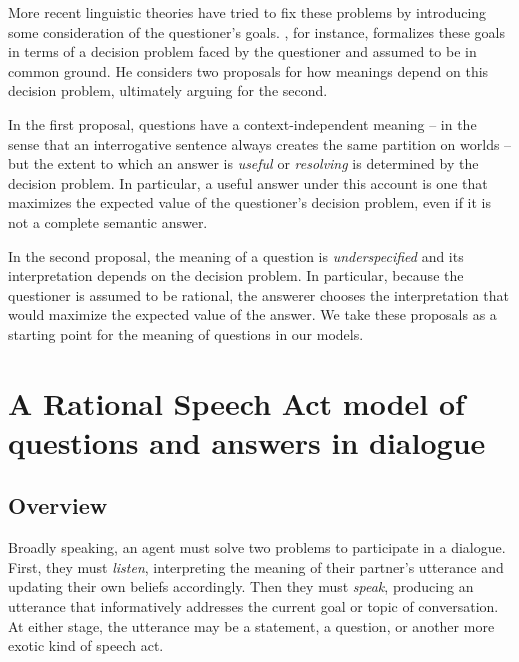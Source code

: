 \documentclass[12pt, floatsintext, jou]{apa6}
\begin{document}
More recent linguistic theories have tried to fix these problems by introducing some consideration of the questioner's goals. , for instance, formalizes these goals in terms of a decision problem faced by the questioner and assumed to be in common ground. He considers two proposals for how meanings depend on this decision problem, ultimately arguing for the second. 

In the first proposal, questions have a context-independent meaning -- in the sense that an interrogative sentence always creates the same partition on worlds -- but the extent to which an answer is \emph{useful} or \emph{resolving} is determined by the decision problem. In particular, a useful answer under this account is one that maximizes the expected value of the questioner's decision problem, even if it is not a complete semantic answer. 

In the second proposal, the meaning of a question is \emph{underspecified} and its interpretation depends on the decision problem. In particular, because the questioner is assumed to be rational, the answerer chooses the interpretation that would maximize the expected value of the answer. We take these proposals as a starting point for the meaning of questions in our models.

\section{A Rational Speech Act model of \\questions and answers in dialogue}

\subsection{Overview}

Broadly speaking, an agent must solve two problems to participate in a dialogue. First, they must \emph{listen}, interpreting the meaning of their partner's utterance and updating their own beliefs accordingly. Then they must \emph{speak}, producing an utterance that informatively addresses the current goal or topic of conversation. At either stage, the utterance may be a statement, a question, or another more exotic kind of speech act. 
\end{document}
